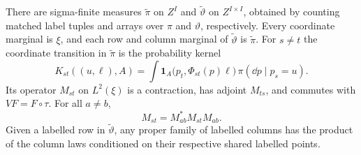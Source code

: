 \begin{lemma}\label{lem:counting-lift}
There are sigma-finite measures $\widetilde\pi$ on $Z^I$ and
$\widetilde\vartheta$ on $Z^{I\times I}$, obtained by counting matched
label tuples and arrays over $\pi$ and $\vartheta$, respectively.
Every coordinate marginal is $\xi$, and each row and column marginal
of $\widetilde\vartheta$ is $\widetilde\pi$.
For $s\ne t$ the coordinate transition in $\widetilde\pi$ is the
probability kernel
\begin{equation}\label{eq:label-transition-kernel}
 K_{st}((u,\ell),A)=
 \int\mathbf1_A\bigl(p_t,\Phi_{st}(p)\ell\bigr)
                   \,\pi(\dd p\mid p_s=u).
\end{equation}
Its operator $M_{st}$ on $L^2(\xi)$ is a contraction, has adjoint
$M_{ts}$, and commutes with $V F=F\circ\tau$. For all $a\ne b$,
\begin{equation}\label{eq:label-square-identity}
 M_{st}=M_{ab}^*M_{st}M_{ab}.
\end{equation}
Given a labelled row in $\widetilde\vartheta$, any proper family of
labelled columns has the product of the column laws conditioned on
their respective shared labelled points.
\end{lemma}

